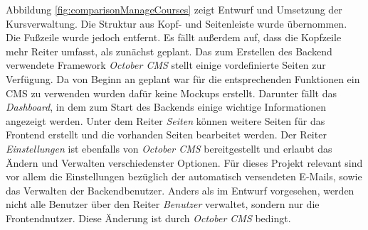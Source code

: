         Abbildung \ref{fig:comparisonManageCourses} zeigt Entwurf und Umsetzung der Kursverwaltung.
        Die Struktur aus Kopf- und Seitenleiste wurde übernommen.
        Die Fußzeile wurde jedoch entfernt.
        Es fällt außerdem auf, dass die Kopfzeile mehr Reiter umfasst, als zunächst geplant.
        Das zum Erstellen des Backend verwendete Framework \textit{October CMS} stellt einige vordefinierte Seiten zur Verfügung. Da von Beginn an geplant war für die entsprechenden Funktionen ein CMS zu verwenden wurden dafür keine Mockups erstellt.
        Darunter fällt das \textit{Dashboard}, in dem zum Start des Backends einige wichtige Informationen angezeigt werden.
        Unter dem Reiter \textit{Seiten} können weitere Seiten für das Frontend erstellt und die vorhanden Seiten bearbeitet werden.
        Der Reiter \textit{Einstellungen} ist ebenfalls von \textit{October CMS} bereitgestellt und erlaubt das Ändern und Verwalten verschiedenster Optionen.
        Für dieses Projekt relevant sind vor allem die Einstellungen bezüglich der automatisch versendeten E-Mails, sowie das Verwalten der Backendbenutzer.
        Anders als im Entwurf vorgesehen, werden nicht alle Benutzer über den Reiter \textit{Benutzer} verwaltet, sondern nur die Frontendnutzer.
        Diese Änderung ist durch \textit{October CMS} bedingt.
        

